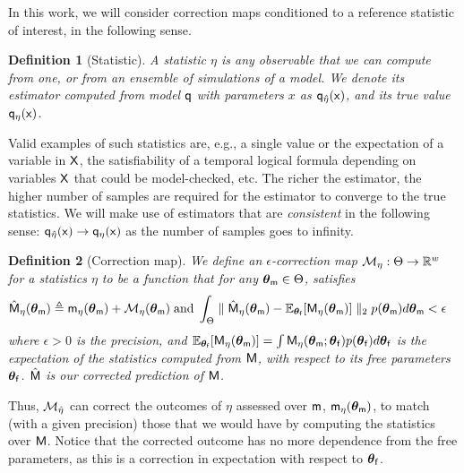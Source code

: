 \documentclass[runningheads,a4paper]{llncs}
\newtheorem{mydef}{Definition}
\newcommand{\bM}{{\sf{M}}}
\newcommand{\ebM}{{\hat{\sf{M}}}}
\newcommand{\bm}{{\sf{m}}}
\newcommand{\cvar}{{\sf{X}}}
\newcommand{\pfpar}{\bth_{\sf{f}}}
\newcommand{\pmpar}{\bth_{\sf{m}}}
\newcommand{\tstat}{\eta} %
\newcommand{\stat}{{\hat{\eta}}} %
\newcommand{\tmap}{{{\cal M}_\tstat}}
\newcommand{\map}{{{\cal M}_\stat}}
\newcommand{\bth}{\boldsymbol{\theta}}
\newcommand{\R}{\mathbb{R}}
\begin{document}
In this work, we will consider correction maps conditioned to a reference statistic of interest, in the following sense.

\begin{mydef}[Statistic]
A statistic $\tstat$ is {\em any observable that we can compute from  one, or from an ensemble of simulations of a model}.  We denote its {\em estimator} computed from model $\sf{q}$ with parameters $x$ as  $\sf{q}_{\stat}(x)$, and its true value $\sf{q}_{\tstat}(x)$.
\end{mydef}
Valid examples of such statistics  are, e.g., a single value or the expectation of a  variable in $\cvar$, the satisfiability of a temporal logical formula depending on variables $\cvar$ that could be model-checked, etc. The  richer the estimator, the  higher number of samples are required for the estimator to converge to the true statistics. We will make use of estimators that are {\em consistent} in the following sense: $\sf{q}_{\stat}(x) \to \sf{q}_{\tstat}(x)$ as the number of samples goes to infinity.



\begin{mydef}[Correction map]
	\label{def:correction}
We define   {\em  an $\epsilon$-correction map} ${\tmap}: \Theta \to \R^w$ for a {\em statistics} $\tstat$ to be a function  that for any  $\bth_{\bm}\in \Theta$, satisfies 
{\small
\begin{align}\label{eq:correction}
&\ebM_{\tstat}(\bth_{\bm})  \triangleq \bm_{\tstat}(\bth_{\bm}) + {\tmap}(\bth_{\bm}) 
\;\text{and}\; \int_\Theta \parallel \ebM_{\tstat}(\bth_{\bm})  - \mathbb{E}_{\pfpar}[\bM_{\tstat}(\bth_{\bm})]\parallel_2 p(\pmpar)d\pmpar  <   \epsilon  
\end{align}}
where $\epsilon>0$ is the precision,  
and $\mathbb{E}_{\pfpar}[\bM_{\tstat}(\bth_{\bm})] = \int \bM_{\tstat}(\pmpar; \pfpar)p(\pfpar)d\pfpar$ is the {\em expectation of the statistics} computed from $\bM$, with respect to its free parameters $\pfpar$. $\ebM$ is our {\em corrected prediction} of $\bM$. 
\end{mydef}
 Thus, $\map$  can  correct the outcomes of $\tstat$ assessed over $\bm$, $\bm_{\tstat}(\bth_{\bm})$, to match (with a given precision) those that we would have by computing the statistics over $\bM$. Notice that the corrected outcome has no more dependence from the free parameters, as this is a correction in expectation with respect to $\pfpar$. 
\end{document}
